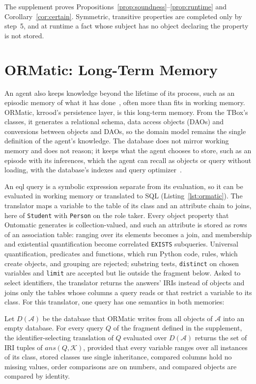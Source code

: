 \documentclass[sigconf,anonymous]{aamas}
\begin{document}
The supplement proves Propositions~\ref{prop:soundness}--\ref{prop:runtime} and Corollary~\ref{cor:certain}. Symmetric, transitive properties are completed only by step~5, and at runtime a fact whose subject has no object declaring the property is not stored.

\section{ORMatic: Long-Term Memory}
\label{sec:ormatic}

An agent also keeps knowledge beyond the lifetime of its process, such as an episodic memory of what it has done~\cite{beetz2025robot}, often more than fits in working memory. ORMatic, \ac{krrood}'s persistence layer, is this long-term memory. From the TBox's classes, it generates a relational schema, data access objects (DAOs) and conversions between objects and DAOs, so the domain model remains the single definition of the agent's knowledge. The database does not mirror working memory and does not reason; it keeps what the agent chooses to store, such as an episode with its inferences, which the agent can recall as objects or query without loading, with the database's indexes and query optimizer~\cite{selinger1979access}.

An \ac{eql} query is a symbolic expression separate from its evaluation, so it can be evaluated in working memory or translated to SQL (Listing~\ref{lst:ormatic}). The translator maps a variable to the table of its class and an attribute chain to joins, here of \texttt{Student} with \texttt{Person} on the role taker. Every object property that Ontomatic generates is collection-valued, and such an attribute is stored as rows of an association table: ranging over its elements becomes a join, and membership and existential quantification become correlated \texttt{EXISTS} subqueries. Universal quantification, predicates and functions, which run Python code, rules, which create objects, and grouping are rejected; substring tests, \texttt{distinct} on chosen variables and \texttt{limit} are accepted but lie outside the fragment below. Asked to select identifiers, the translator returns the answers' IRIs instead of objects and joins only the tables whose columns a query reads or that restrict a variable to its class. For this translator, one query has one semantics in both memories:

\begin{theorem}
\label{thm:ormatic}
Let $D(\mathcal{A})$ be the database that ORMatic writes from all objects of $\mathcal{A}$ into an empty database. For every query $Q$ of the fragment defined in the supplement, the identifier-selecting translation of $Q$ evaluated over $D(\mathcal{A})$ returns the set of IRI tuples of $\mathit{ans}(Q,\mathcal{K})$, provided that every variable ranges over all instances of its class, stored classes use single inheritance, compared columns hold no missing values, order comparisons are on numbers, and compared objects are compared by identity.
\end{theorem}
\end{document}
